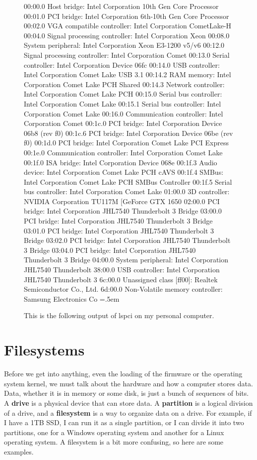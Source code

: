 \documentclass{article}
\theoremstyle{definition}
\newenvironment{cverbatim}
    {\SaveVerbatim{cverb}}
    {\endSaveVerbatim
    \flushleft\fboxrule=0pt\fboxsep=.5em
    \colorbox{cverbbg}{%
      \makebox[\dimexpr\linewidth-2\fboxsep][l]{\BUseVerbatim{cverb}}%
    }
    \endflushleft
  }
\begin{document}
      \begin{figure}[hbt!]
        \centering 
        \begin{cverbatim} 
00:00.0 Host bridge: Intel Corporation 10th Gen Core Processor 
00:01.0 PCI bridge: Intel Corporation 6th-10th Gen Core Processor 
00:02.0 VGA compatible controller: Intel Corporation CometLake-H 
00:04.0 Signal processing controller: Intel Corporation Xeon 
00:08.0 System peripheral: Intel Corporation Xeon E3-1200 v5/v6 
00:12.0 Signal processing controller: Intel Corporation Comet 
00:13.0 Serial controller: Intel Corporation Device 06fc
00:14.0 USB controller: Intel Corporation Comet Lake USB 3.1 
00:14.2 RAM memory: Intel Corporation Comet Lake PCH Shared 
00:14.3 Network controller: Intel Corporation Comet Lake PCH
00:15.0 Serial bus controller: Intel Corporation Comet Lake 
00:15.1 Serial bus controller: Intel Corporation Comet Lake 
00:16.0 Communication controller: Intel Corporation Comet 
00:1c.0 PCI bridge: Intel Corporation Device 06b8 (rev f0)
00:1c.6 PCI bridge: Intel Corporation Device 06be (rev f0)
00:1d.0 PCI bridge: Intel Corporation Comet Lake PCI Express
00:1e.0 Communication controller: Intel Corporation Comet Lake 
00:1f.0 ISA bridge: Intel Corporation Device 068e
00:1f.3 Audio device: Intel Corporation Comet Lake PCH cAVS
00:1f.4 SMBus: Intel Corporation Comet Lake PCH SMBus Controller
00:1f.5 Serial bus controller: Intel Corporation Comet Lake 
01:00.0 3D controller: NVIDIA Corporation TU117M [GeForce GTX 1650 
02:00.0 PCI bridge: Intel Corporation JHL7540 Thunderbolt 3 Bridge
03:00.0 PCI bridge: Intel Corporation JHL7540 Thunderbolt 3 Bridge
03:01.0 PCI bridge: Intel Corporation JHL7540 Thunderbolt 3 Bridge
03:02.0 PCI bridge: Intel Corporation JHL7540 Thunderbolt 3 Bridge
03:04.0 PCI bridge: Intel Corporation JHL7540 Thunderbolt 3 Bridge
04:00.0 System peripheral: Intel Corporation JHL7540 Thunderbolt 
38:00.0 USB controller: Intel Corporation JHL7540 Thunderbolt 3 
6c:00.0 Unassigned class [ff00]: Realtek Semiconductor Co., Ltd. 
6d:00.0 Non-Volatile memory controller: Samsung Electronics Co 
        \end{cverbatim}
        \caption{This is the following output of lspci on my personal computer. } 
        \label{fig:}
      \end{figure}


\section{Filesystems}

  Before we get into anything, even the loading of the firmware or the operating system kernel, we must talk about the hardware and how a computer stores data. Data, whether it is in memory or some disk, is just a bunch of sequences of bits. A \textbf{drive} is a physical device that can store data. A \textbf{partition} is a logical division of a drive, and a \textbf{filesystem} is a way to organize data on a drive. For example, if I have a 1TB SSD, I can run it as a single partition, or I can divide it into two partitions, one for a Windows operating system and another for a Linux operating system. A filesystem is a bit more confusing, so here are some examples. 
\end{document}
